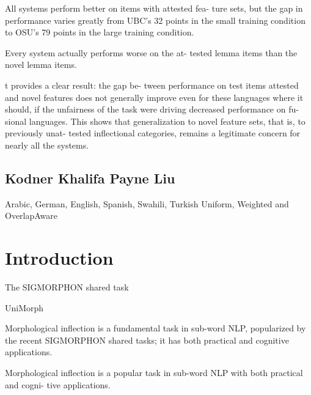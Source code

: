 \documentclass[11pt]{article}
\begin{document}
All systems perform better on items with attested fea- ture sets, but the gap in performance varies greatly from UBC’s 32 points in the small training condition to OSU’s 79 points in the large training condition.

Every system actually performs worse on the at- tested lemma items than the novel lemma items.

t provides a clear result: the gap be- tween performance on test items attested and novel features does not generally improve even for these languages where it should, if the unfairness of the task were driving decreased performance on fu- sional languages. This shows that generalization to novel feature sets, that is, to previously unat- tested inflectional categories, remains a legitimate concern for nearly all the systems.

\subsection{Kodner Khalifa Payne Liu}

Arabic, German, English, Spanish, Swahili, Turkish 
Uniform, Weighted and OverlapAware 

\section{Introduction}

The SIGMORPHON shared task \citep{cotterell-etal-2016-sigmorphon, cotterell-etal-2017-conll, cotterell-etal-2018-conll, mccarthy-etal-2019-sigmorphon, vylomova-etal-2020-sigmorphon, pimentel-ryskina-etal-2021-sigmorphon, kodner-khalifa-2022-sigmorphon, goldman-etal-2023-sigmorphon}

UniMorph \citep{mccarthy-etal-2020-unimorph, batsuren-etal-2022-unimorph}



\citet{goldman-etal-2022-un}

\citet{kodner-etal-2023-morphological}

\citet{kodner-khalifa-2022-sigmorphon}

\citet{kodner-etal-2023-exploring}

\citet{kodner2023re}


Morphological inflection is a fundamental task in sub-word NLP, popularized by the recent SIGMORPHON shared tasks; it has both practical and cognitive applications. 






Morphological inflection is a popular task in sub-word NLP with both practical and cogni- tive applications.
\end{document}
